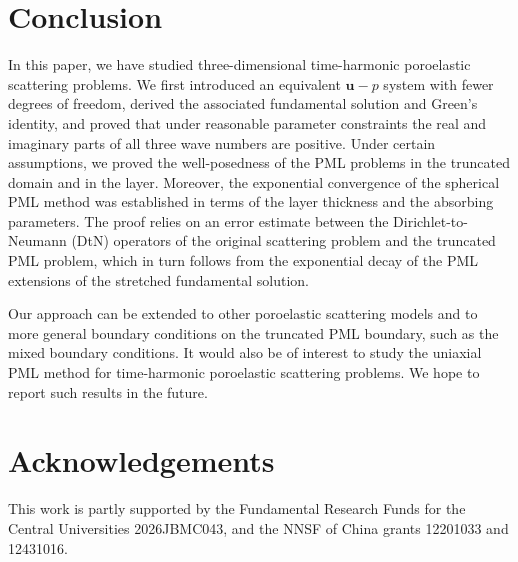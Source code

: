 \documentclass[11pt]{article}
\begin{document}
\section{Conclusion}\label{sec:conclusion}

In this paper, we have studied three-dimensional time-harmonic poroelastic scattering problems.
We first introduced an equivalent $\mathbf{u}-p$ system with fewer degrees of freedom, derived 
the associated fundamental solution and Green's identity, and proved that under reasonable parameter 
constraints the real and imaginary parts of all three wave numbers are positive. Under certain assumptions,
 we proved the well-posedness of the PML problems in the truncated domain and in the layer.
Moreover, the exponential convergence of the spherical PML method was established in terms of the 
layer thickness and the absorbing parameters. The proof relies on an error estimate between the 
Dirichlet-to-Neumann (DtN) operators of the original scattering problem and the truncated PML problem, 
which in turn follows from the exponential decay of the PML extensions of the stretched fundamental solution.

Our approach can be extended to other poroelastic scattering models and to more general boundary conditions 
on the truncated PML boundary, such as the mixed boundary conditions. It would also be of interest to study 
the uniaxial PML method for time-harmonic poroelastic scattering problems. We hope to report such results in the future.


\section*{Acknowledgements}

This work is partly supported by the Fundamental Research Funds for the Central Universities 2026JBMC043, 
and the NNSF of China grants 12201033 and 12431016.
\end{document}
